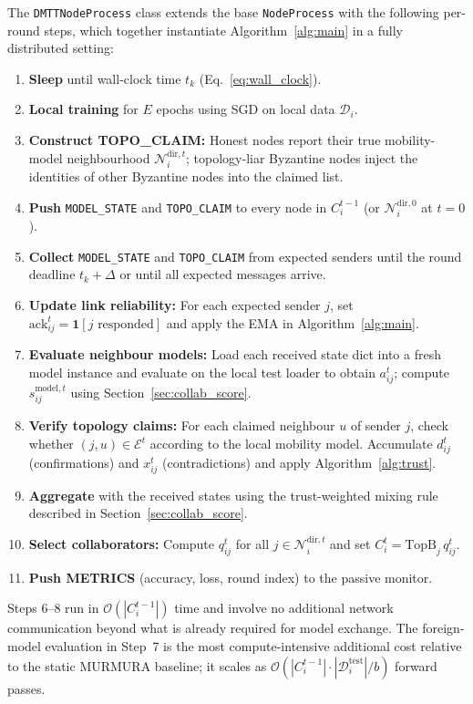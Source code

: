 \documentclass[journal]{IEEEtran}
\newenvironment{added}{\begingroup\color{addedcolor}}{\endgroup}
\theoremstyle{definition}
\theoremstyle{remark}
\begin{document}
\begin{added}
The \texttt{DMTTNodeProcess} class extends the base \texttt{NodeProcess} with the following per-round steps, which together instantiate Algorithm~\ref{alg:main} in a fully distributed setting:

\begin{enumerate}[leftmargin=2em, label=\arabic*.]
  \item \textbf{Sleep} until wall-clock time $t_k$ (Eq.~\eqref{eq:wall_clock}).
  \item \textbf{Local training} for $E$ epochs using SGD on local data $\mathcal{D}_i$.
  \item \textbf{Construct TOPO\_CLAIM:} Honest nodes report their true mobility-model neighbourhood $\mathcal{N}_i^{\mathrm{dir},t}$; topology-liar Byzantine nodes inject the identities of other Byzantine nodes into the claimed list.
  \item \textbf{Push} \texttt{MODEL\_STATE} and \texttt{TOPO\_CLAIM} to every node in $C_i^{t-1}$ (or $\mathcal{N}_i^{\mathrm{dir},0}$ at $t=0$).
  \item \textbf{Collect} \texttt{MODEL\_STATE} and \texttt{TOPO\_CLAIM} from expected senders until the round deadline $t_k + \Delta$ or until all expected messages arrive.
  \item \textbf{Update link reliability:} For each expected sender $j$, set $\mathrm{ack}_{ij}^t = \mathbf{1}[j\text{ responded}]$ and apply the EMA in Algorithm~\ref{alg:main}.
  \item \textbf{Evaluate neighbour models:} Load each received state dict into a fresh model instance and evaluate on the local test loader to obtain $a_{ij}^t$; compute $s_{ij}^{\mathrm{model},t}$ using Section~\ref{sec:collab_score}.
  \item \textbf{Verify topology claims:} For each claimed neighbour $u$ of sender $j$, check whether $(j,u) \in \mathcal{E}^t$ according to the local mobility model. Accumulate $d_{ij}^t$ (confirmations) and $x_{ij}^t$ (contradictions) and apply Algorithm~\ref{alg:trust}.
  \item \textbf{Aggregate} with the received states using the trust-weighted mixing rule described in Section~\ref{sec:collab_score}.
  \item \textbf{Select collaborators:} Compute $q_{ij}^t$ for all $j \in \mathcal{N}_i^{\mathrm{dir},t}$ and set $C_i^t = \mathrm{TopB}_j\,q_{ij}^t$.
  \item \textbf{Push METRICS} (accuracy, loss, round index) to the passive monitor.
\end{enumerate}

Steps 6--8 run in $\mathcal{O}(|C_i^{t-1}|)$ time and involve no additional network communication beyond what is already required for model exchange.
The foreign-model evaluation in Step~7 is the most compute-intensive additional cost relative to the static MURMURA baseline; it scales as $\mathcal{O}(|C_i^{t-1}| \cdot |\mathcal{D}_i^{\mathrm{test}}| / b)$ forward passes.
\end{added}
\end{document}
